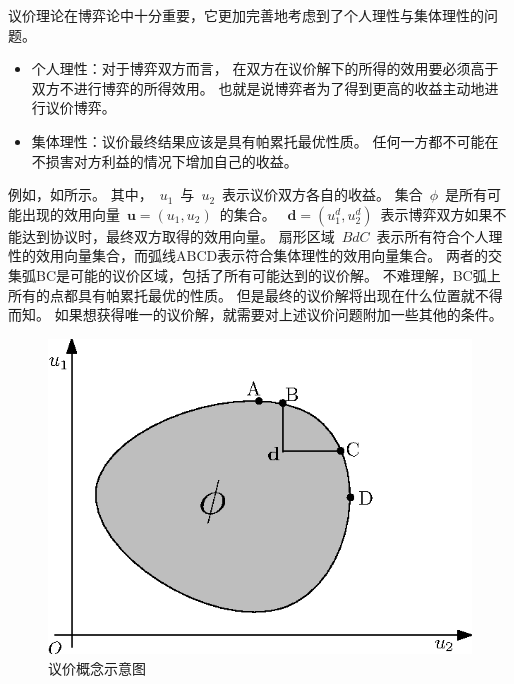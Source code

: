 议价理论在博弈论中十分重要，它更加完善地考虑到了个人理性与集体理性的问题。
\begin{itemize}
\item 个人理性：对于博弈双方而言，
在双方在议价解下的所得的效用要必须高于双方不进行博弈的所得效用。
也就是说博弈者为了得到更高的收益主动地进行议价博弈。
\item 集体理性：议价最终结果应该是具有帕累托最优性质。
任何一方都不可能在不损害对方利益的情况下增加自己的收益。
\end{itemize}
例如，如所示。
其中，~$u_1$~与~$u_2$~表示议价双方各自的收益。
集合~$\phi$~是所有可能出现的效用向量~$\mathbf{u}=(u_1,u_2)$~的集合。
~$\mathbf{d}=(u_1^d, u_2^d)$~表示博弈双方如果不能达到协议时，最终双方取得的效用向量。
扇形区域~$BdC$~表示所有符合个人理性的效用向量集合，而弧线ABCD表示符合集体理性的效用向量集合。
两者的交集弧BC是可能的议价区域，包括了所有可能达到的议价解。
不难理解，BC弧上所有的点都具有帕累托最优的性质。
但是最终的议价解将出现在什么位置就不得而知。
如果想获得唯一的议价解，就需要对上述议价问题附加一些其他的条件。
\begin{figure}[!tb] 
    \centering
   \begin{minipage}[t]{0.5\linewidth} 
    \centering 
    \includegraphics[width = \textwidth]{bargain_basic_concept} 
    \caption{议价概念示意图} 
    \label{fig:chap_bargain:bargain_basic_concept} 
  \end{minipage}%
\end{figure}

